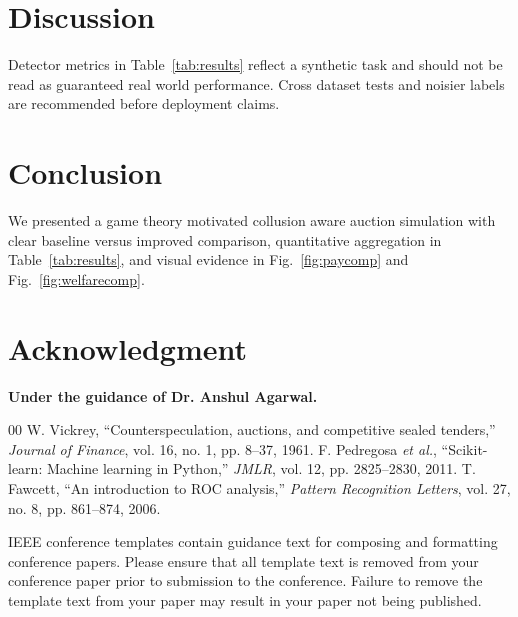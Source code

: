 \documentclass[conference]{IEEEtran}
\begin{document}
\section{Discussion}
Detector metrics in Table~\ref{tab:results} reflect a synthetic task and should not be read as guaranteed real world performance. Cross dataset tests and noisier labels are recommended before deployment claims.

\section{Conclusion}
We presented a game theory motivated collusion aware auction simulation with clear baseline versus improved comparison, quantitative aggregation in Table~\ref{tab:results}, and visual evidence in Fig.~\ref{fig:paycomp} and Fig.~\ref{fig:welfarecomp}.

\section*{Acknowledgment}
\textbf{Under the guidance of Dr. Anshul Agarwal.}

\begin{thebibliography}{00}
 W. Vickrey, ``Counterspeculation, auctions, and competitive sealed tenders,'' \emph{Journal of Finance}, vol. 16, no. 1, pp. 8--37, 1961.
 F. Pedregosa \emph{et al.}, ``Scikit-learn: Machine learning in Python,'' \emph{JMLR}, vol. 12, pp. 2825--2830, 2011.
 T. Fawcett, ``An introduction to ROC analysis,'' \emph{Pattern Recognition Letters}, vol. 27, no. 8, pp. 861--874, 2006.
\end{thebibliography}

\vspace{12pt}
\color{red}
IEEE conference templates contain guidance text for composing and formatting conference papers. Please ensure that all template text is removed from your conference paper prior to submission to the conference. Failure to remove the template text from your paper may result in your paper not being published.
\end{document}
